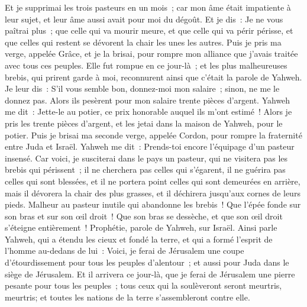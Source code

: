 \begin{multicols}{2}
Et je supprimai les trois pasteurs en un mois~; car mon âme était impatiente à leur sujet, et leur âme aussi avait pour moi du dégoût.
Et je dis~: Je ne vous paîtrai plus~; que celle qui va mourir meure, et que celle qui va périr périsse, et que celles qui restent se dévorent la chair les unes les autres.
Puis je pris ma verge, appelée Grâce, et je la brisai, pour rompre mon alliance que j'avais traitée avec tous ces peuples.
Elle fut rompue en ce jour-là~; et les plus malheureuses brebis, qui prirent garde à moi, reconnurent ainsi que c'était la parole de Yahweh.
Je leur dis~: S'il vous semble bon, donnez-moi mon salaire~; sinon, ne me le donnez pas. Alors ils pesèrent pour mon salaire trente pièces d'argent.
Yahweh me dit~: Jette-le au potier, ce prix honorable auquel ils m'ont estimé~! Alors je pris les trente pièces d'argent, et les jetai dans la maison de Yahweh, pour le potier.
Puis je brisai ma seconde verge, appelée Cordon, pour rompre la fraternité entre Juda et Israël.
Yahweh me dit~: Prends-toi encore l'équipage d'un pasteur insensé.
Car voici, je susciterai dans le pays un pasteur, qui ne visitera pas les brebis qui périssent~; il ne cherchera pas celles qui s'égarent, il ne guérira pas celles qui sont blessées, et il ne portera point celles qui sont demeurées en arrière, mais il dévorera la chair des plus grasses, et il déchirera jusqu'aux cornes de leurs pieds.
Malheur au pasteur inutile qui abandonne les brebis~! Que l'épée fonde sur son bras et sur son œil droit~! Que son bras se dessèche, et que son œil droit s'éteigne entièrement~!
\VerseOne{}Prophétie, parole de Yahweh, sur Israël. Ainsi parle Yahweh, qui a étendu les cieux et fondé la terre, et qui a formé l'esprit de l'homme au-dedans de lui~:
Voici, je ferai de Jérusalem une coupe d'étourdissement pour tous les peuples d'alentour~; et aussi pour Juda dans le siège de Jérusalem.
Et il arrivera ce jour-là, que je ferai de Jérusalem une pierre pesante pour tous les peuples~; tous ceux qui la soulèveront seront meurtris, meurtris; et toutes les nations de la terre s'assembleront contre elle.

\end{multicols}
